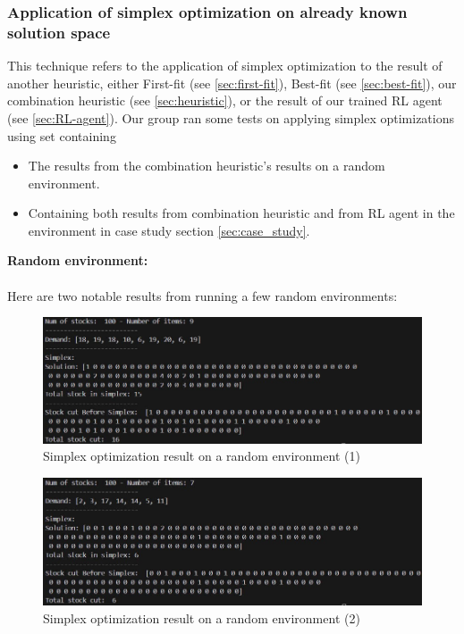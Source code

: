 \documentclass[a4paper]{article}
\begin{document}
    \subsubsection{Application of simplex optimization on already known solution space}
    This technique refers to the application of simplex optimization to the result of another heuristic, either First-fit (see \ref{sec:first-fit}), Best-fit (see \ref{sec:best-fit}), our combination heuristic (see \ref{sec:heuristic}), or the result of our trained RL agent (see \ref{sec:RL-agent}). Our group ran some tests on applying simplex optimizations using set  containing 
    \begin{itemize}
        \item The results from the combination heuristic's results on a random environment.
        \item Containing both results from combination heuristic and from RL agent in the environment in case study section \ref{sec:case_study}.
    \end{itemize}

    \textbf{Random environment:}
    \\ \\
    Here are two notable results from running a few random environments:
    \begin{figure}[h]
        \centering
        \includegraphics[scale = 0.53]{Image/simplex_random_1.jpg}
        \caption{Simplex optimization result on a random environment (1)}
    \end{figure}

    \begin{figure}[h]
        \centering
        \includegraphics[scale = 0.53]{Image/simplex_random_2.jpg}
        \caption{Simplex optimization result on a random environment (2)}
    \end{figure}
\end{document}
